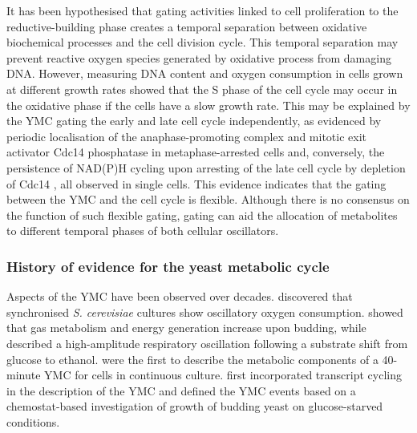It has been hypothesised that gating activities linked to cell proliferation to the reductive-building phase
creates a temporal separation between oxidative biochemical processes and the cell division cycle.
This temporal separation may prevent reactive oxygen species generated by oxidative process from damaging DNA\@.
However, measuring DNA content and oxygen consumption in cells grown at different growth rates \parencite{slavovCouplingGrowthRate2011} showed that the S phase of the cell cycle may occur in the oxidative phase if the cells have a slow growth rate.
This may be explained by the YMC gating the early and late cell cycle independently, as evidenced by periodic localisation of the anaphase-promoting complex and mitotic exit activator Cdc14 phosphatase in metaphase-arrested cells \parencite{luPeriodicCyclinCdkActivity2010} and, conversely, the persistence of NAD(P)H cycling upon arresting of the late cell cycle by depletion of Cdc14 \parencite{papagiannakisAutonomousMetabolicOscillations2017}, all observed in single cells.
This evidence indicates that the gating between the YMC and the cell cycle is flexible.
Although there is no consensus on the function of such flexible gating,
gating can aid the allocation of metabolites to different temporal phases of both cellular oscillators.

\subsubsection{History of evidence for the yeast metabolic cycle}
\label{subsubsec:intro-ymc-definition-history}


Aspects of the YMC have been observed over decades.
\textcite{nosohSYNCHRONIZATIONBUDDINGCYCLE1962} discovered that synchronised \textit{S. cerevisiae} cultures show oscillatory oxygen consumption.
\textcite{kasparvonmeyenburgEnergeticsBuddingCycle1969} showed that gas metabolism and energy generation increase upon budding, while \textcite{mochanRespiratoryOscillationsAdapting1973} described a high-amplitude respiratory oscillation following a substrate shift from glucose to ethanol.
\textcite{satroutdinovOscillatoryMetabolismSaccharomyces1992} were the first to describe the metabolic components of a 40-minute YMC for cells in continuous culture.
\textcite{tuLogicYeastMetabolic2005}
first incorporated transcript cycling in the description of the YMC and defined the YMC events
based on a chemostat-based investigation of growth of budding yeast on glucose-starved conditions.

